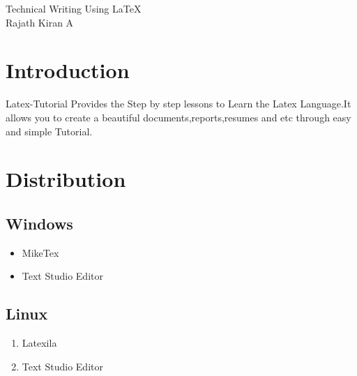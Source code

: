 \documentclass{article}
\begin{document}
	\begin{center}
		\huge{Technical Writing Using LaTeX}\\[1.5em]
		\LARGE{Rajath Kiran A}\\[1.5em]
	\end{center}
	\section{Introduction}
	Latex-Tutorial Provides the Step by step lessons to Learn the Latex Language.It allows you to create a beautiful documents,reports,resumes and etc through easy and simple Tutorial.
	\section{Distribution} 
	\subsection{Windows}
	\begin{itemize}
		\item MikeTex
		\item Text Studio Editor
	\end{itemize}
	\subsection{Linux}
	\begin{enumerate}
		\item Latexila
		\item Text Studio Editor
	\end{enumerate}
\end{document}
